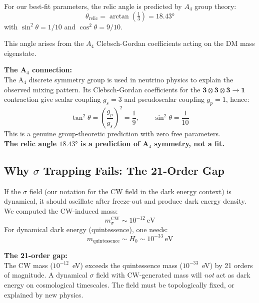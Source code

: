 \documentclass[12pt, a4paper]{article}
\begin{document}
For our best-fit parameters, the relic angle is predicted by $A_4$ group theory:
\begin{equation}
  \theta_\text{relic} = \arctan\!\left(\tfrac{1}{3}\right) = 18.43°
\end{equation}
with $\sin^2\!\theta = 1/10$ and $\cos^2\!\theta = 9/10$.

This angle arises from the $A_4$ Clebsch-Gordan coefficients acting on the DM mass eigenstate.

\begin{insightbox}
\textbf{The A$_4$ connection:}\\
The A$_4$ discrete symmetry group is used in neutrino physics to explain the observed mixing pattern.
Its Clebsch-Gordan coefficients for the $\mathbf{3}\otimes\mathbf{3}\otimes\mathbf{3}\to\mathbf{1}$
contraction give scalar coupling $g_s = 3$ and pseudoscalar coupling $g_p = 1$, hence:
$$\tan^2\!\theta = \left(\frac{g_p}{g_s}\right)^{\!2} = \frac{1}{9}, \qquad
  \sin^2\!\theta = \frac{1}{10}$$
This is a genuine group-theoretic prediction with zero free parameters.\\[0.3em]
\textbf{The relic angle $18.43°$ is a prediction of A$_4$ symmetry, not a fit.}
\end{insightbox}

\subsection{Why $\sigma$ Trapping Fails: The 21-Order Gap}

If the $\sigma$ field (our notation for the CW field in the dark energy context) is dynamical, it should oscillate after freeze-out and produce dark energy density. We computed the CW-induced mass:
\begin{equation}
  m_\sigma^\text{CW} \sim 10^{-12}~\text{eV}
\end{equation}
For dynamical dark energy (quintessence), one needs:
\begin{equation}
  m_\text{quintessence} \sim H_0 \sim 10^{-33}~\text{eV}
\end{equation}

\begin{failbox}
\textbf{The 21-order gap:}\\
The CW mass ($10^{-12}$~eV) exceeds the quintessence mass ($10^{-33}$~eV) by 21 orders of magnitude.
A dynamical $\sigma$ field with CW-generated mass will \emph{not} act as dark energy on cosmological timescales.
The field must be topologically fixed, or explained by new physics.
\end{failbox}
\end{document}

